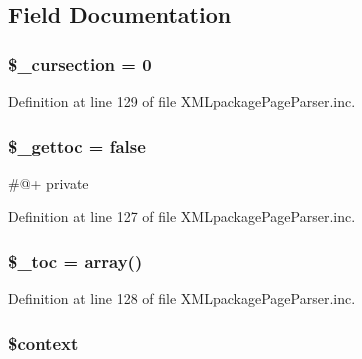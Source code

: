 \subsection{\-Field \-Documentation}
\hypertarget{class_x_m_l_package_page_parser_a0cf7bdb874d70717622e82e05f89506d}{
\subsubsection[{\$\-\_\-cursection}]{\setlength{\rightskip}{0pt plus 5cm}\$\-\_\-cursection = 0}}\label{class_x_m_l_package_page_parser_a0cf7bdb874d70717622e82e05f89506d}


\-Definition at line 129 of file \-X\-M\-Lpackage\-Page\-Parser.\-inc.

\hypertarget{class_x_m_l_package_page_parser_aaf22fbb23ebd3d1734cbca6e8478f5e6}{
\subsubsection[{\$\-\_\-gettoc}]{\setlength{\rightskip}{0pt plus 5cm}\$\-\_\-gettoc = false}}\label{class_x_m_l_package_page_parser_aaf22fbb23ebd3d1734cbca6e8478f5e6}
\#@+  private 

\-Definition at line 127 of file \-X\-M\-Lpackage\-Page\-Parser.\-inc.

\hypertarget{class_x_m_l_package_page_parser_a89239c7c6ac8aca36371eeec9753c130}{
\subsubsection[{\$\-\_\-toc}]{\setlength{\rightskip}{0pt plus 5cm}\$\-\_\-toc = array()}}\label{class_x_m_l_package_page_parser_a89239c7c6ac8aca36371eeec9753c130}


\-Definition at line 128 of file \-X\-M\-Lpackage\-Page\-Parser.\-inc.

\hypertarget{class_x_m_l_package_page_parser_ae05dedb802ada0155efdece2044fed64}{
\subsubsection[{\$context}]{\setlength{\rightskip}{0pt plus 5cm}\$context}}\label{class_x_m_l_package_page_parser_ae05dedb802ada0155efdece2044fed64}


